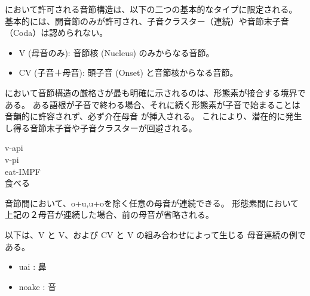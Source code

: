 \langname において許可される音節構造は、以下の二つの基本的なタイプに限定される。
基本的には、開音節のみが許可され、子音クラスター（連続）や音節末子音（Coda）は認められない。

\begin{itemize}
    \item {V (母音のみ)}: 音節核 (Nucleus) のみからなる音節。
    \item {CV (子音＋母音)}: 頭子音 (Onset) と音節核からなる音節。
\end{itemize}

\langname において音節構造の厳格さが最も明確に示されるのは、形態素が接合する境界である。
ある語根が子音で終わる場合、それに続く形態素が子音で始まることは音韻的に許容されず、必ず介在母音
が挿入される。
これにより、潜在的に発生し得る音節末子音や子音クラスターが回避される。

\begin{exe}
    \ex \glll v-api \\
    v-pi \\
    eat-IMPF \\
        \glt 食べる
\end{exe}

音節間において、o+u,u+oを除く任意の母音が連続できる。
形態素間において上記の２母音が連続した場合、前の母音が省略される。

以下は、{V} と {V}、および {CV} と {V} の組み合わせによって生じる
母音連続の例である。

\begin{itemize}
    \item uai : 鼻
    \item noake : 音
\end{itemize}



